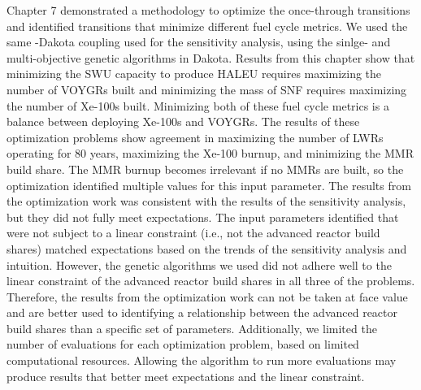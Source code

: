 Chapter 7 demonstrated a methodology to optimize the once-through 
transitions and identified transitions that minimize different 
fuel cycle metrics. We used the same \Cyclus-Dakota coupling used 
for the sensitivity analysis, using the sinlge- and multi-objective 
genetic algorithms in Dakota. Results from this chapter show that minimizing the 
\gls{SWU} capacity to produce \gls{HALEU} requires maximizing the number of 
VOYGRs built and minimizing the mass of \gls{SNF} requires maximizing the number 
of Xe-100s built. Minimizing both of these fuel cycle metrics is a 
balance between deploying Xe-100s and VOYGRs. The results of  
these optimization problems show agreement in maximizing the number 
of \glspl{LWR} operating for 80 years, maximizing the Xe-100 burnup,
and minimizing the \gls{MMR} build share. The \gls{MMR} burnup becomes
irrelevant if no \glspl{MMR} are built, so the optimization 
identified multiple values for this input parameter. The results 
from the optimization 
work was consistent with the results of the sensitivity analysis, but 
they did not fully meet expectations. The input parameters identified that 
were not subject to a linear constraint (i.e., not the advanced reactor 
build shares) matched expectations based on the trends of the sensitivity 
analysis and intuition. However, the genetic algorithms we used 
did not adhere well to the linear constraint of the advanced reactor 
build shares in all three of the problems. Therefore, the 
results from the optimization work can not be taken at face value 
and are better used to identifying a relationship between the advanced 
reactor build shares than a specific set of parameters. Additionally, 
we limited the number of evaluations for each optimization problem,
based on limited computational resources. Allowing the 
algorithm to run more evaluations may produce results that better 
meet expectations and the linear constraint. 

